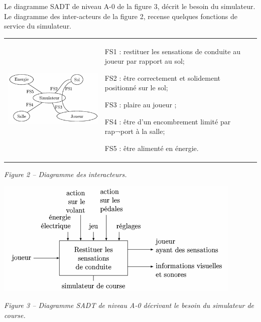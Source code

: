 \documentclass[10pt,fleqn]{article} %
\begin{document}
Le diagramme SADT de niveau A-0 de la figure 3, %
décrit le besoin du simulateur. 
Le diagramme des inter-acteurs de la figure 2, %
recense quelques fonctions de service du simulateur. 


\begin{center}
\begin{tabular}{p{.45\linewidth}p{.45\linewidth}}

\begin{center}
\includegraphics[width=.9\linewidth]{images/fig_02}

\end{center}
& 
FS1 : restituer les sensations de conduite au joueur par rapport au sol; 

FS2 : être correctement et solidement positionné sur le sol; 

FS3 : plaire au joueur ; 

FS4 : être d'un encombrement limité par rap¬port à la salle; 

FS5 : être alimenté en énergie. 
\end{tabular}
\textit{Figure 2 -- Diagramme des interacteurs.}
\end{center}
\begin{center}
\includegraphics[width=.9\linewidth]{images/fig_03}

\textit{Figure 3 -- Diagramme SADT de niveau A-0 décrivant le besoin du simulateur de course.}
\end{center}
\end{document}
